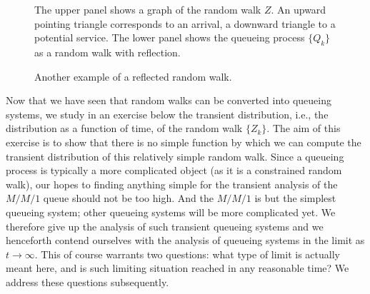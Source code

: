 \begin{figure}[ht]
  \centering

%
\caption{The upper panel shows a graph of the random walk $Z$. An
  upward pointing triangle corresponds to an arrival, a downward
  triangle to a potential service. The lower panel shows the queueing
  process $\{Q_k\}$ as a random walk with reflection.}
\label{fig:random_bernoulli}
\end{figure}

\begin{figure}[ht]
  \centering

\caption{Another example of a reflected random walk.}
\label{fig:random_walk}
\end{figure}

Now that we have seen that random walks can be converted into queueing
systems, we study in an exercise below the transient distribution,
i.e., the distribution as a function of time, of the random walk
$\{Z_k\}$. The aim of this exercise is to show that there is no simple
function by which we can compute the transient distribution of this
relatively simple random walk. Since a queueing process is typically a
more complicated object (as it is a constrained random walk), our
hopes to finding anything simple for the transient analysis of the
$M/M/1$ queue should not be too high. And the $M/M/1$ is but the
simplest queueing system; other queueing systems will be more
complicated yet.  We therefore give up the analysis of such transient
queueing systems and we henceforth contend ourselves with the analysis
of queueing systems in the limit as $t\to\infty$.  This of course
warrants two questions: what type of limit is actually meant here, and
is such limiting situation reached in any reasonable time? We address
these questions subsequently.

